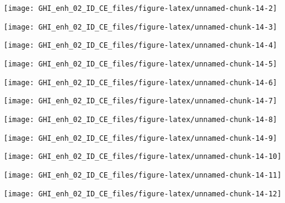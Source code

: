 \documentclass[
  10pt,
  a4paper,oneside]{article}
\begin{document}
\begin{center}\texttt{[image: GHI\_enh\_02\_ID\_CE\_files/figure-latex/unnamed-chunk-14-2]} \end{center}

\begin{center}\texttt{[image: GHI\_enh\_02\_ID\_CE\_files/figure-latex/unnamed-chunk-14-3]} \end{center}

\begin{center}\texttt{[image: GHI\_enh\_02\_ID\_CE\_files/figure-latex/unnamed-chunk-14-4]} \end{center}

\begin{center}\texttt{[image: GHI\_enh\_02\_ID\_CE\_files/figure-latex/unnamed-chunk-14-5]} \end{center}

\begin{center}\texttt{[image: GHI\_enh\_02\_ID\_CE\_files/figure-latex/unnamed-chunk-14-6]} \end{center}

\begin{center}\texttt{[image: GHI\_enh\_02\_ID\_CE\_files/figure-latex/unnamed-chunk-14-7]} \end{center}

\begin{center}\texttt{[image: GHI\_enh\_02\_ID\_CE\_files/figure-latex/unnamed-chunk-14-8]} \end{center}

\begin{center}\texttt{[image: GHI\_enh\_02\_ID\_CE\_files/figure-latex/unnamed-chunk-14-9]} \end{center}

\begin{center}\texttt{[image: GHI\_enh\_02\_ID\_CE\_files/figure-latex/unnamed-chunk-14-10]} \end{center}

\begin{center}\texttt{[image: GHI\_enh\_02\_ID\_CE\_files/figure-latex/unnamed-chunk-14-11]} \end{center}

\begin{center}\texttt{[image: GHI\_enh\_02\_ID\_CE\_files/figure-latex/unnamed-chunk-14-12]} \end{center}
\end{document}
